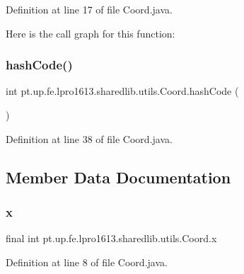 Definition at line 17 of file Coord.\+java.

Here is the call graph for this function\+:
\hypertarget{classpt_1_1up_1_1fe_1_1lpro1613_1_1sharedlib_1_1utils_1_1_coord_aba6a1e22404fa05826536d96a00bd5c4}{}\label{classpt_1_1up_1_1fe_1_1lpro1613_1_1sharedlib_1_1utils_1_1_coord_aba6a1e22404fa05826536d96a00bd5c4} 
\subsubsection{\texorpdfstring{hash\+Code()}{hashCode()}}
{\footnotesize\ttfamily int pt.\+up.\+fe.\+lpro1613.\+sharedlib.\+utils.\+Coord.\+hash\+Code (\begin{DoxyParamCaption}{ }\end{DoxyParamCaption})}



Definition at line 38 of file Coord.\+java.



\subsection{Member Data Documentation}
\hypertarget{classpt_1_1up_1_1fe_1_1lpro1613_1_1sharedlib_1_1utils_1_1_coord_af2171634c65acdea92a4b9794069058b}{}\label{classpt_1_1up_1_1fe_1_1lpro1613_1_1sharedlib_1_1utils_1_1_coord_af2171634c65acdea92a4b9794069058b} 
\subsubsection{\texorpdfstring{x}{x}}
{\footnotesize\ttfamily final int pt.\+up.\+fe.\+lpro1613.\+sharedlib.\+utils.\+Coord.\+x}



Definition at line 8 of file Coord.\+java.

\hypertarget{classpt_1_1up_1_1fe_1_1lpro1613_1_1sharedlib_1_1utils_1_1_coord_a8ebd9de4e95352eb228ecbd1fe916259}{}\label{classpt_1_1up_1_1fe_1_1lpro1613_1_1sharedlib_1_1utils_1_1_coord_a8ebd9de4e95352eb228ecbd1fe916259} 
